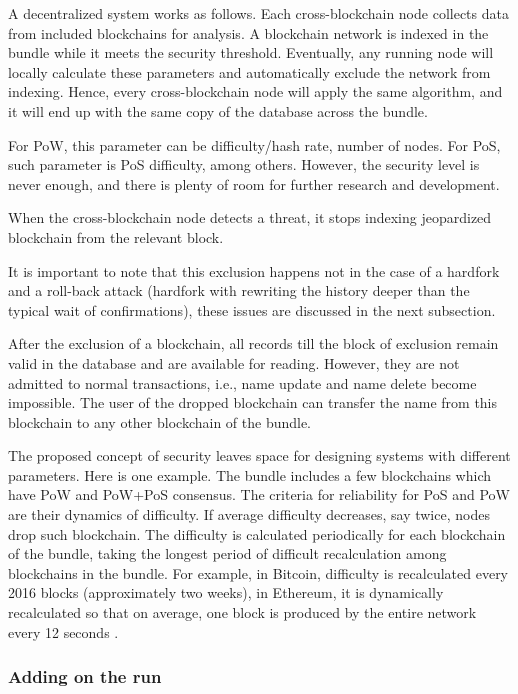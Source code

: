 \begin{multicols}{2}
A decentralized system works as follows. Each cross-blockchain node collects data from included blockchains for analysis. A blockchain network is indexed in the bundle while it meets the security threshold. Eventually, any running node will locally calculate these parameters and automatically exclude the network from indexing. Hence, every cross-blockchain node will apply the same algorithm, and it will end up with the same copy of the database across the bundle.

For PoW, this parameter can be difficulty/hash rate, number of nodes. For PoS, such parameter is PoS difficulty, among others. However, the security level is never enough, and there is plenty of room for further research and development.

When the cross-blockchain node detects a threat, it stops indexing jeopardized blockchain from the relevant block.

It is important to note that this exclusion happens not in the case of a hardfork and a roll-back attack (hardfork with rewriting the history deeper than the typical wait of confirmations), these issues are discussed in the next subsection.

After the exclusion of a blockchain, all records till the block of exclusion remain valid in the database and are available for reading. However, they are not admitted to normal transactions, i.e., name update and name delete become impossible. The user of the dropped blockchain can transfer the name from this blockchain to any other blockchain of the bundle.

The proposed concept of security leaves space for designing systems with different parameters. Here is one example. The bundle includes a few blockchains which have PoW and PoW+PoS consensus. The criteria for reliability for PoS and PoW are their dynamics of difficulty. If average difficulty decreases, say twice, nodes drop such blockchain. The difficulty is calculated periodically for each blockchain of the bundle, taking the longest period of difficult recalculation among blockchains in the bundle. For example, in Bitcoin, difficulty is recalculated every 2016 blocks (approximately two weeks), in Ethereum, it is dynamically recalculated so that on average, one block is produced by the entire network every 12 seconds \cite{art1-key34}.

\vspace{-.7cm}

\subsubsection{Adding on the run}\label{subsubsec-4.2.d}


\end{multicols}
